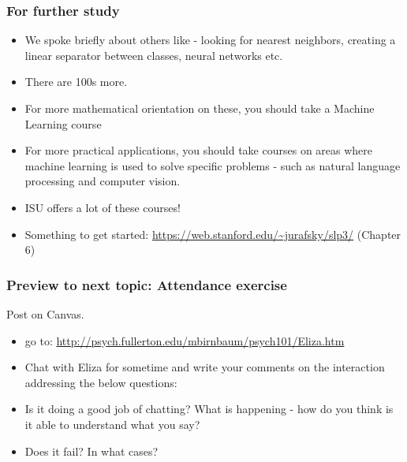 \documentclass{beamer}
\begin{document}
\begin{frame}
\frametitle{For further study}
\begin{itemize}
\item We spoke briefly about others like - looking for nearest neighbors, creating a linear separator between classes, neural networks etc. 
\item There are 100s more. 
\item For more mathematical orientation on these, you should take a Machine Learning course
\item For more practical applications, you should take courses on areas where machine learning is used to solve specific problems - such as natural language processing and computer vision.
\item ISU offers a lot of these courses!
\item Something to get started: \url{https://web.stanford.edu/~jurafsky/slp3/} (Chapter 6)
\end{itemize}
\end{frame}

\begin{frame}
\frametitle{Preview to next topic: Attendance exercise}
Post on Canvas.
\begin{itemize}
\item go to: \url{http://psych.fullerton.edu/mbirnbaum/psych101/Eliza.htm}
\item Chat with Eliza for sometime and write your comments on the interaction addressing the below questions:
\item Is it doing a good job of chatting? What is happening - how do you think is it able to understand what you say?
\item Does it fail? In what cases?
\end{itemize}
\end{frame}
\end{document}
